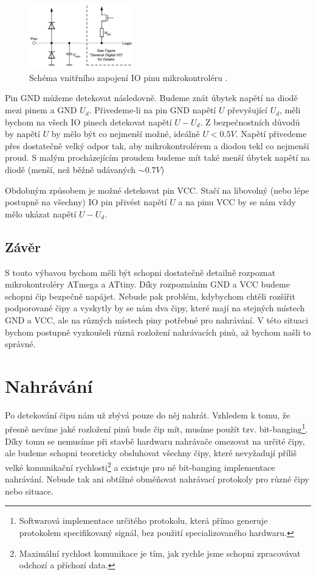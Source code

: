\documentclass[11pt,a4paper,twoside,openright]{report}
\begin{document}
\begin{figure}[ht!]
  \includegraphics[width=0.4\textwidth]{img/pin_diagram.png}
  \centering
  \caption{Schéma vnitřního zapojení IO pinu mikrokontroléru \cite[str.~58]{atmega328}.}
  \label{fig:pin_diagram}
\end{figure}

Pin GND můžeme detekovat následovně. Budeme znát úbytek napětí na diodě mezi pinem a GND $U_d$. Přivedeme-li na pin GND napětí $U$ převyšující $U_d$, měli bychom na všech IO pinech detekovat napětí $U-U_d$. Z bezpečnostních důvodů by napětí $U$ by mělo být co nejmenší možné, ideálně $U<0.5V$. Napětí přivedeme přes dostatečně velký odpor tak, aby mikrokontrolérem a diodou tekl co nejmenší proud. S malým procházejícím proudem budeme mít také menší úbytek napětí na diodě (menší, než běžně udávaných $\sim0.7V$)

Obdobným způsobem je možné detekovat pin VCC. Stačí na libovolný (nebo lépe postupně na všechny) IO pin přivést napětí $U$ a na pinu VCC by se nám vždy mělo ukázat napětí $U-U_d$.

\subsection {Závěr}

S touto výbavou bychom měli být schopni dostatečně detailně rozpoznat mikrokontroléry ATmega a ATtiny. Díky rozpoznáním GND a VCC budeme schopni čip bezpečně napájet. Nebude pak problém, kdybychom chtěli rozšířit podporované čipy a vyskytly by se nám dva čipy, které mají na stejných místech GND a VCC, ale na různých místech piny potřebné pro nahrávání. V této situaci bychom postupně vyzkoušeli různá rozložení nahrávacích pinů, až bychom našli to správné.

\section {Nahrávání}

Po detekování čipu nám už zbývá pouze do něj nahrát. Vzhledem k tomu, že přesně nevíme jaké rozložení pinů bude čip mít, musíme použít tzv. bit-banging\footnote{Softwarová implementace určitého protokolu, která přímo generuje protokolem specifikovaný signál, bez použití specializovaného hardwaru.}. Díky tomu se nemusíme při stavbě hardwaru nahrávače omezovat na určité čipy, ale budeme schopni teoreticky obsluhovat všechny čipy, které nevyžadují příliš velké komunikační rychlosti\footnote{Maximální rychlost komunikace je tím, jak rychle jsme schopni zpracovávat odchozí a příchozí data.} a existuje pro ně bit-banging implementace nahrávání. Nebude tak ani obtížné obměňovat nahrávací protokoly pro různé čipy nebo situace.
\end{document}

